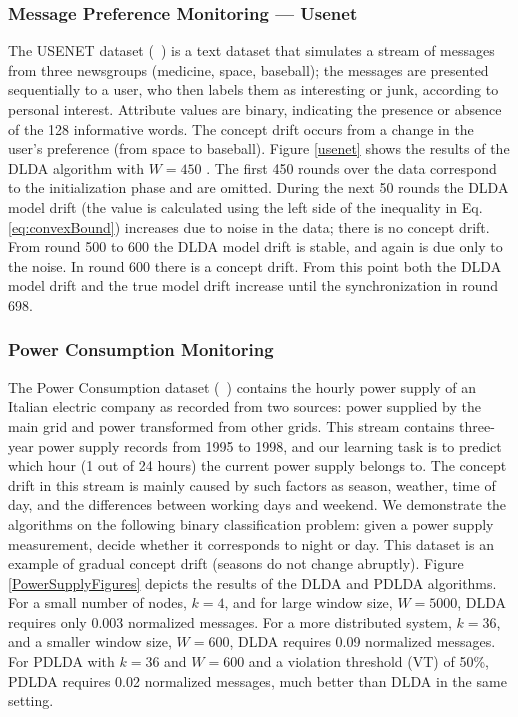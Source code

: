 \subsubsection{Message Preference Monitoring --- Usenet}
The USENET dataset (~\citealt{usenet}) is a text dataset that simulates a stream of messages from three newsgroups (medicine, space, baseball); the messages are presented sequentially to a user, who then labels them as interesting or junk, according to personal interest. Attribute values are binary, indicating the presence or absence of the 128 informative words. The concept drift occurs from a change in the user's preference (from space to baseball). 
Figure \ref{usenet} shows the results of the DLDA algorithm with $W=450$ . The first 450 rounds over the data correspond to
the initialization phase and are omitted. During the next 50 rounds the DLDA model drift (the value is calculated using the left side of the inequality in Eq. \ref{eq:convexBound}) increases due to noise in the data; there is
no concept drift. From round 500 to 600 the DLDA model drift is stable,
and again is due only to the noise. In round 600 there is a concept
drift.
From this point both the DLDA model drift and the true model drift increase until the synchronization in round 698.
\subsubsection{Power Consumption Monitoring}
The Power Consumption dataset  (~\citealt{powerSupply}) contains the hourly power supply of an
Italian electric company as recorded from two sources: power supplied
by the main grid and power transformed from other grids.
This stream contains three-year power supply records
from 1995 to 1998, and our learning task is to predict which hour (1 out of 24 hours) the current power supply belongs to. The concept drift in this stream
is mainly caused by such factors as season, weather, time of day,
and the differences between working days and weekend.
We demonstrate the algorithms on the following binary classification problem:
given a power supply measurement, decide whether it corresponds to night or day.
This dataset is an example of gradual concept drift (seasons do not
change abruptly).
Figure \ref{PowerSupplyFigures} depicts the results of the DLDA
and PDLDA algorithms. For a small number of nodes, $k=4$, and for large
window size, $W=5000$, DLDA requires only 0.003 normalized messages.
For a more distributed system, $k=36$, and a smaller window
size, $W=600$, DLDA requires 0.09 normalized messages. For PDLDA with
$k=36$ and $W=600$ and a violation threshold (VT) of 50\%, PDLDA
requires 0.02 normalized messages, much better than DLDA in the same setting.

